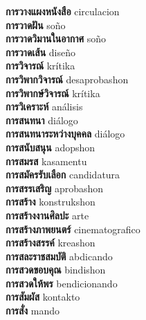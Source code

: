 \textbf{ การวางแผงหนังสือ  } circulacion \\
\textbf{ การวาดฝัน  } soño \\
\textbf{ การวาดวิมานในอากาศ  } soño \\
\textbf{ การวาดเส้น  } diseño \\
\textbf{ การวิจารณ์  } krítika \\
\textbf{ การวิพากวิจารณ์  } desaprobashon \\
\textbf{ การวิพากษ์วิจารณ์  } krítika \\
\textbf{ การวิเคราะห์  } análisis \\
\textbf{ การสนทนา  } diálogo \\
\textbf{ การสนทนาระหว่างบุคคล  } diálogo \\
\textbf{ การสนับสนุน  } adopshon \\
\textbf{ การสมรส  } kasamentu \\
\textbf{ การสมัครรับเลือก  } candidatura \\
\textbf{ การสรรเสริญ  } aprobashon \\
\textbf{ การสร้าง  } konstrukshon \\
\textbf{ การสร้างงานศิลปะ  } arte \\
\textbf{ การสร้างภาพยนตร์  } cinematografico \\
\textbf{ การสร้างสรรค์  } kreashon \\
\textbf{ การสละราชสมบัติ  } abdicando \\
\textbf{ การสวดขอบคุณ  } bindishon \\
\textbf{ การสวดให้พร  } bendicionando \\
\textbf{ การสัมผัส  } kontakto \\
\textbf{ การสั่ง  } mando \\

